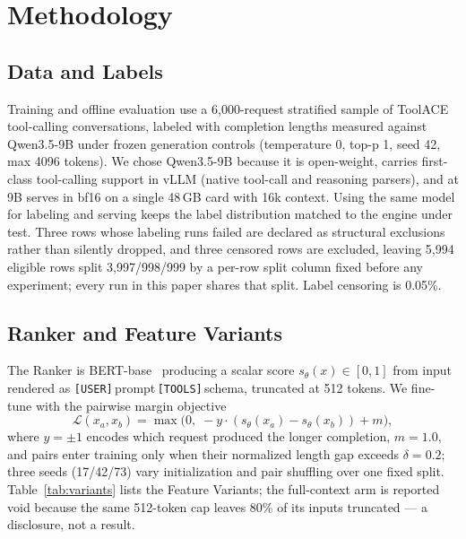 \section{Methodology}

\subsection{Data and Labels}
Training and offline evaluation use a 6{,}000-request stratified
sample of ToolACE tool-calling conversations, labeled with completion
lengths measured against Qwen3.5-9B under frozen generation controls
(temperature 0, top-p 1, seed 42, max 4096 tokens). We chose Qwen3.5-9B
because it is open-weight, carries first-class tool-calling support in vLLM
(native tool-call and reasoning parsers), and at 9B serves in bf16 on a
single 48\,GB card with 16k context. Using the same model for labeling and
serving keeps the label distribution matched to the engine under test. Three rows whose labeling
runs failed are declared as structural exclusions rather than silently
dropped, and three censored rows are excluded, leaving 5{,}994 eligible rows
split 3{,}997/998/999 by a per-row split column
fixed before any experiment; every run in this paper shares that split.
Label censoring is 0.05\%.

\subsection{Ranker and Feature Variants}
The Ranker is BERT-base~\cite{bert} producing a scalar score
$s_\theta(x) \in [0,1]$ from input rendered as
\texttt{[USER]}\,prompt\,\texttt{[TOOLS]}\,schema, truncated at 512 tokens.
We fine-tune with the pairwise margin objective
\begin{equation}
\mathcal{L}(x_a, x_b) = \max\bigl(0,\; -y \cdot (s_\theta(x_a) - s_\theta(x_b)) + m\bigr),
\end{equation}
where $y = \pm 1$ encodes which request produced the longer completion,
$m{=}1.0$, and pairs enter training only when their normalized length gap
exceeds $\delta{=}0.2$; three seeds (17/42/73) vary initialization and pair
shuffling over one fixed split. Table~\ref{tab:variants} lists the Feature Variants; the
full-context arm is reported void because the same 512-token cap leaves
80\% of its inputs truncated --- a disclosure, not a result.

